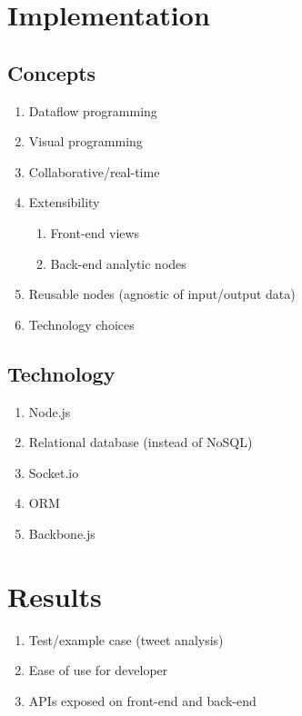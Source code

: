 \documentclass[midd]{thesis}
\begin{document}
\chapter{Implementation}

\section{Concepts}
  \begin{enumerate}
    \item Dataflow programming
    \item Visual programming
    \item Collaborative/real-time
    \item Extensibility
    \begin{enumerate}
      \item Front-end views
      \item Back-end analytic nodes
    \end{enumerate}
    \item Reusable nodes (agnostic of input/output data)
    \item Technology choices
  \end{enumerate}

\section{Technology}
  \begin{enumerate}
    \item Node.js
    \item Relational database (instead of NoSQL)
    \item Socket.io
    \item ORM
    \item Backbone.js
  \end{enumerate}

\chapter{Results}
  \begin{enumerate}
    \item Test/example case (tweet analysis)
    \item Ease of use for developer
    \item APIs exposed on front-end and back-end
  \end{enumerate}
\end{document}
